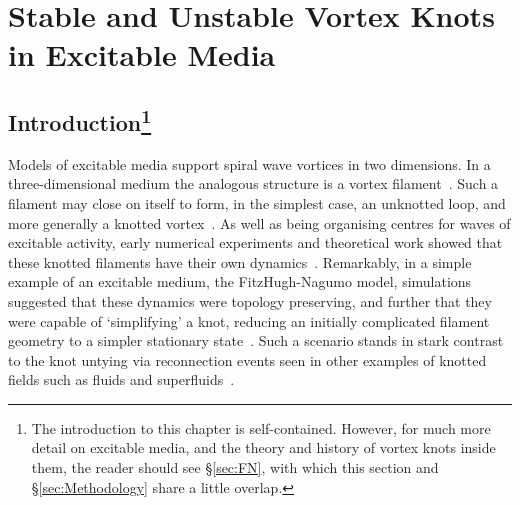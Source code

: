 \chapter{Stable and Unstable Vortex Knots in Excitable Media}
\label{ch:FitzHughNagumo}
\section{Introduction\footnote{The introduction to this chapter is self-contained. However, for much more detail on excitable media, and the theory and history of vortex knots inside them, the reader should see \S\ref{sec:FN}, with which this section and \S\ref{sec:Methodology} share a little overlap.}}

Models of excitable media support spiral wave vortices in two dimensions. In a three-dimensional medium the analogous structure is a vortex filament~\citep{Winfree1983}. Such a filament may close on itself to form, in the simplest case, an unknotted loop, and more generally a knotted vortex~\citep{Winfree1983b}. As well as being organising centres for waves of excitable activity, early numerical experiments and theoretical work showed that these knotted filaments have their own dynamics~\citep{Keener1988,Winfree1990, Keener1992,Henze1993, Biktashev1994,WinfreeChapter,Dierckx2010}. Remarkably, in a simple example of an excitable medium, the FitzHugh-Nagumo model, simulations suggested that these dynamics were topology preserving, and further that they were capable of `simplifying' a knot, reducing an initially complicated filament geometry to a simpler stationary state~\citep{Winfree1990,Henze1993,WinfreeChapter}. Such a scenario stands in stark contrast to the knot untying via reconnection events seen in other examples of knotted fields such as fluids and superfluids~\citep{Kleckner2013,Scheeler2014,Kleckner2016}. 

